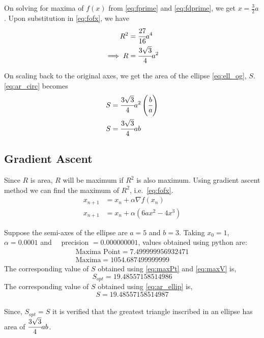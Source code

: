 \documentclass[journal,12pt,twocolumn]{IEEEtran}
\providecommand{\brak}[1]{\ensuremath{\left(#1\right)}}
\begin{document}
On solving for maxima of $f(x)$ from \eqref{eq:fprime} and \eqref{eq:fdprime}, we get $x=\frac{3}{2}a$. Upon substitution in \eqref{eq:fofx}, we have
\begin{align}
		R^2 &= \cfrac{27}{16}a^4 \nonumber\\
		\implies R &= \cfrac{3\sqrt{3}}{4}a^2 \label{eq:ar_circ}
\end{align}

On scaling back to the original axes, we get the area of the ellipse \eqref{eq:ell_og}, $S$. \eqref{eq:ar_circ} becomes
\begin{align}
		S &= \cfrac{3\sqrt{3}}{4}a^2 \brak{\cfrac{b}{a}} \nonumber \\
		S &= \cfrac{3\sqrt{3}}{4}ab \label{eq:ar_ellip}
\end{align}

\subsection*{\textbf{Gradient Ascent}}

Since $R$ is area, $R$ will be maximum if $R^2$ is also maximum. Using gradient ascent method we can find the maximum of $R^2$, i.e.\ \eqref{eq:fofx}.
\begin{align}
		x_{n+1} &= x_n + \alpha \nabla f(x_n) \\
		x_{n+1} &= x_n + \alpha \brak{6ax^2-4x^3}
\end{align}

Suppose the semi-axes of the ellipse are $a=5$ and $b=3$. Taking $x_0 = 1$, $\alpha=0.0001$ and $\quad$precision $= 0.000000001$, values obtained using python are:
\begin{align}
		\boxed{\text{Maxima Point} = 7.499999956932471} \label{eq:maxPt} \\
		\boxed{\text{Maxima} = 1054.687499999999} \label{eq:maxV}
\end{align}
\newpage
The corresponding value of $S$ obtained using \eqref{eq:maxPt} and \eqref{eq:maxV} is, \[ \boxed{S_{opt}=19.48557158514986} \]
The corresponding value of $S$ obtained using \eqref{eq:ar_ellip} is, \[ \boxed{S=19.48557158514987} \]
\\
Since, $S_{opt}=S$ it is verified that the greatest triangle inscribed in an ellipse has area of $\cfrac{3\sqrt{3}}{4}{}ab$.
\medskip

\begin{figure}[h]
\centering
\def\figwidth{\linewidth}
\def\figheight{0.315\textheight} %

\label{fig:rough}
\end{figure}
\end{document}
